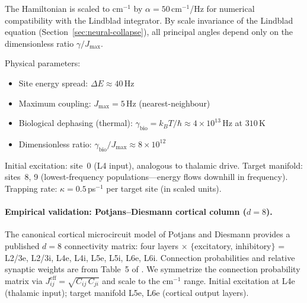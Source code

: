 \documentclass[12pt,a4paper]{article}
\theoremstyle{definition}
\theoremstyle{remark}
\begin{document}
The Hamiltonian is scaled to cm$^{-1}$ by $\alpha = 50$\,cm$^{-1}$/Hz for numerical compatibility with the Lindblad integrator. By scale invariance of the Lindblad equation (Section~\ref{sec:neural-collapse}), all principal angles depend only on the dimensionless ratio $\gamma/J_{\max}$.

Physical parameters:
\begin{itemize}
\item Site energy spread: $\Delta E \approx 40$\,Hz
\item Maximum coupling: $J_{\max} = 5$\,Hz (nearest-neighbour)
\item Biological dephasing (thermal): $\gamma_{\mathrm{bio}} = k_BT/\hbar \approx 4 \times 10^{13}$\,Hz at $310$\,K
\item Dimensionless ratio: $\gamma_{\mathrm{bio}}/J_{\max} \approx 8 \times 10^{12}$
\end{itemize}

Initial excitation: site~0 (L4 input), analogous to thalamic drive. Target manifold: sites~8, 9 (lowest-frequency populations---energy flows downhill in frequency). Trapping rate: $\kappa = 0.5$\,ps$^{-1}$ per target site (in scaled units).

\paragraph{Empirical validation: Potjans--Diesmann cortical column ($d = 8$).}

The canonical cortical microcircuit model of Potjans and Diesmann \cite{potjans2014cell} provides a published $d = 8$ connectivity matrix: four layers $\times$ $\{$excitatory, inhibitory$\}$ = L2/3e, L2/3i, L4e, L4i, L5e, L5i, L6e, L6i. Connection probabilities and relative synaptic weights are from Table~5 of \cite{potjans2014cell}. We symmetrize the connection probability matrix via $J_{ij}^{\mathrm{eff}} = \sqrt{C_{ij}\,C_{ji}}$ and scale to the cm$^{-1}$ range. Initial excitation at L4e (thalamic input); target manifold L5e, L6e (cortical output layers).
\end{document}

